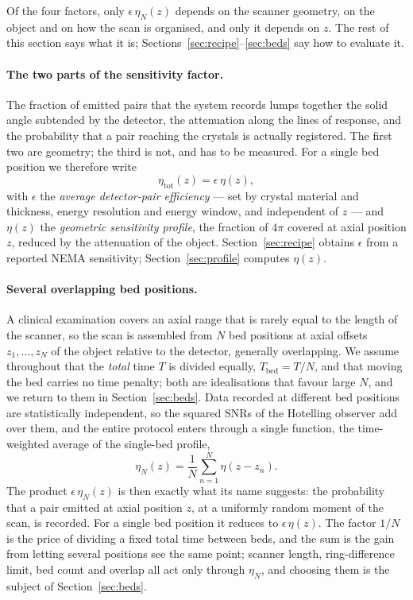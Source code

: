 \documentclass[11pt,a4paper]{article}
\begin{document}
Of the four factors, only $\epsilon\,\eta_N(z)$ depends on the scanner geometry, on the
object and on how the scan is organised, and only it depends on $z$. The rest of this
section says what it is; Sections~\ref{sec:recipe}--\ref{sec:beds} say how to evaluate it.

\paragraph{The two parts of the sensitivity factor.}
The fraction of emitted pairs that the system records lumps together the solid angle
subtended by the detector, the attenuation along the lines of response, and the probability
that a pair reaching the crystals is actually registered. The first two are geometry; the
third is not, and has to be measured. For a single bed position we therefore write
\begin{equation}
  \eta_{\mathrm{tot}}(z)=\epsilon\,\eta(z),
  \label{eq:split}
\end{equation}
with $\epsilon$ the \emph{average detector-pair efficiency} --- set by crystal material and
thickness, energy resolution and energy window, and independent of $z$ --- and $\eta(z)$ the
\emph{geometric sensitivity profile}, the fraction of $4\pi$ covered at axial position $z$,
reduced by the attenuation of the object. Section~\ref{sec:recipe} obtains $\epsilon$ from a
reported NEMA sensitivity; Section~\ref{sec:profile} computes $\eta(z)$.

\paragraph{Several overlapping bed positions.}
A clinical examination covers an axial range that is rarely equal to the length of the
scanner, so the scan is assembled from $N$ bed positions at axial offsets $z_1,\dots,z_N$ of
the object relative to the detector, generally overlapping. We assume throughout that the
\emph{total} time $T$ is divided equally, $T_{\mathrm{bed}}=T/N$, and that moving the bed
carries no time penalty; both are idealisations that favour large $N$, and we return to them
in Section~\ref{sec:beds}. Data recorded at different bed positions are statistically
independent, so the squared SNRs of the Hotelling observer add over them, and the entire
protocol enters through a single function, the time-weighted average of the single-bed
profile,
\begin{equation}
  \eta_N(z)=\frac{1}{N}\sum_{n=1}^{N}\eta(z-z_n).
  \label{eq:etaN}
\end{equation}
The product $\epsilon\,\eta_N(z)$ is then exactly what its name suggests: the probability
that a pair emitted at axial position $z$, at a uniformly random moment of the scan, is
recorded. For a single bed position it reduces to $\epsilon\,\eta(z)$. The factor $1/N$ is
the price of dividing a fixed total time between beds, and the sum is the gain from letting
several positions see the same point; scanner length, ring-difference limit, bed count and
overlap all act only through $\eta_N$, and choosing them is the subject of
Section~\ref{sec:beds}.
\end{document}
